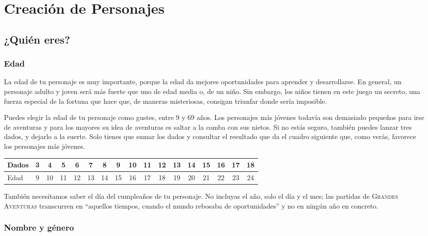 \chapter{Creación de Personajes}

\section{¿Quién eres?}

\subsection{Edad}

La edad de tu personaje es muy importante, porque la edad da mejores oportunidades para aprender y desarrollarse. En general, un personaje adulto y joven será más fuerte que uno de edad media o, de un niño. Sin embargo, los niños tienen en este juego un secreto, una fuerza especial de la fortuna que hace que, de maneras misteriosas, consigan triunfar donde sería imposible. 

Puedes elegir la edad de tu personaje como gustes, entre 9 y 69 años. Los personajes más jóvenes todavía son demasiado pequeños para irse de aventuras y para los mayores su idea de aventuras es saltar a la comba con sus nietos. Si no estás seguro, también puedes lanzar tres dados, y dejarlo a la suerte. Solo tienes que sumar los dados y consultar el resultado que da el cuadro siguiente que, como verás, favorece los personajes más jóvenes.

\begin{table}[h]
\footnotesize
\begin{tabular}{lcccccccccccccccc}
Dados&3&4&5&6&7&8&9&10&11&12&13&14&15&16&17&18\\\midrule
Edad&9&10&11&12&13&14&15&16&17&18&19&20&21&22&23&24\\
\end{tabular}
\end{table}

También necesitamos saber el día del cumpleaños de tu personaje. No incluyas el año, solo el día y el mes; las partidas de \textsc{Grandes Aventuras} transcurren en \enquote{aquellos tiempos, cuando el mundo rebosaba de oportunidades} y no en ningún año en concreto.

\subsection{Nombre y género}

